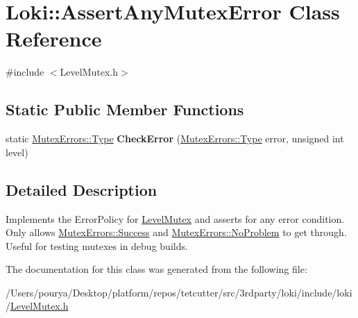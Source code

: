 \hypertarget{classLoki_1_1AssertAnyMutexError}{}\section{Loki\+:\+:Assert\+Any\+Mutex\+Error Class Reference}
\label{classLoki_1_1AssertAnyMutexError}


{\ttfamily \#include $<$Level\+Mutex.\+h$>$}

\subsection*{Static Public Member Functions}
\begin{DoxyCompactItemize}
\item 
\hypertarget{classLoki_1_1AssertAnyMutexError_af7c24a7591706d8717154c9ed9a3cada}{}static \hyperlink{classLoki_1_1MutexErrors_acd0eb6065ca303083d2e0229d7bff590}{Mutex\+Errors\+::\+Type} {\bfseries Check\+Error} (\hyperlink{classLoki_1_1MutexErrors_acd0eb6065ca303083d2e0229d7bff590}{Mutex\+Errors\+::\+Type} error, unsigned int level)\label{classLoki_1_1AssertAnyMutexError_af7c24a7591706d8717154c9ed9a3cada}

\end{DoxyCompactItemize}


\subsection{Detailed Description}
Implements the Error\+Policy for \hyperlink{classLoki_1_1LevelMutex}{Level\+Mutex} and asserts for any error condition. Only allows \hyperlink{classLoki_1_1MutexErrors_acd0eb6065ca303083d2e0229d7bff590a6a170657856ec38decc1a2f1d39406fa}{Mutex\+Errors\+::\+Success} and \hyperlink{classLoki_1_1MutexErrors_acd0eb6065ca303083d2e0229d7bff590ae009e53bdca8c073b62350b8ba168bfd}{Mutex\+Errors\+::\+No\+Problem} to get through. Useful for testing mutexes in debug builds. 

The documentation for this class was generated from the following file\+:\begin{DoxyCompactItemize}
\item 
/\+Users/pourya/\+Desktop/platform/repos/tetcutter/src/3rdparty/loki/include/loki/\hyperlink{LevelMutex_8h}{Level\+Mutex.\+h}\end{DoxyCompactItemize}
